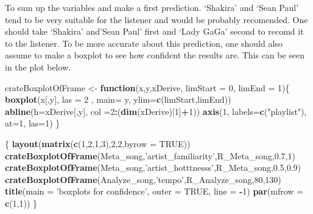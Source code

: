 \documentclass[]{article}
\newenvironment{Shaded}{\begin{snugshade}}{\end{snugshade}}
\newcommand{\KeywordTok}[1]{\textcolor[rgb]{0.13,0.29,0.53}{\textbf{#1}}}
\newcommand{\DataTypeTok}[1]{\textcolor[rgb]{0.13,0.29,0.53}{#1}}
\newcommand{\DecValTok}[1]{\textcolor[rgb]{0.00,0.00,0.81}{#1}}
\newcommand{\FloatTok}[1]{\textcolor[rgb]{0.00,0.00,0.81}{#1}}
\newcommand{\StringTok}[1]{\textcolor[rgb]{0.31,0.60,0.02}{#1}}
\newcommand{\OtherTok}[1]{\textcolor[rgb]{0.56,0.35,0.01}{#1}}
\newcommand{\ControlFlowTok}[1]{\textcolor[rgb]{0.13,0.29,0.53}{\textbf{#1}}}
\newcommand{\OperatorTok}[1]{\textcolor[rgb]{0.81,0.36,0.00}{\textbf{#1}}}
\newcommand{\NormalTok}[1]{#1}
\begin{document}
To sum up the variables and make a first prediction. `Shakira' and `Sean
Paul' tend to be very suitable for the listener and would be probably
recomended. One should take `Shakira' and'Sean Paul' first and `Lady
GaGa' second to recomd it to the listener. To be more accurate about
this prediction, one should also assume to make a boxplot to see how
confident the results are. This can be seen in the plot below.

\begin{Shaded}
\begin{Highlighting}[]
\NormalTok{crateBoxplotOfFrame <-}\StringTok{ }\ControlFlowTok{function}\NormalTok{(x,y,xDerive, }\DataTypeTok{limStart =} \DecValTok{0}\NormalTok{, }\DataTypeTok{limEnd =} \DecValTok{1}\NormalTok{)\{}
  \KeywordTok{boxplot}\NormalTok{(x[,y], }\DataTypeTok{las =} \DecValTok{2}\NormalTok{ , }\DataTypeTok{main=}\NormalTok{ y, }\DataTypeTok{ylim=}\KeywordTok{c}\NormalTok{(limStart,limEnd))}
\KeywordTok{abline}\NormalTok{(}\DataTypeTok{h=}\NormalTok{xDerive[,y], }\DataTypeTok{col =}\DecValTok{2}\OperatorTok{:}\NormalTok{(}\KeywordTok{dim}\NormalTok{(xDerive)[}\DecValTok{1}\NormalTok{]}\OperatorTok{+}\DecValTok{1}\NormalTok{))}
\KeywordTok{axis}\NormalTok{(}\DecValTok{1}\NormalTok{, }\DataTypeTok{labels=}\KeywordTok{c}\NormalTok{(}\StringTok{"playlist"}\NormalTok{), }\DataTypeTok{at=}\DecValTok{1}\NormalTok{, }\DataTypeTok{las=}\DecValTok{1}\NormalTok{)}
\NormalTok{\}}

\NormalTok{\{}
\KeywordTok{layout}\NormalTok{(}\KeywordTok{matrix}\NormalTok{(}\KeywordTok{c}\NormalTok{(}\DecValTok{1}\NormalTok{,}\DecValTok{2}\NormalTok{,}\DecValTok{1}\NormalTok{,}\DecValTok{3}\NormalTok{),}\DecValTok{2}\NormalTok{,}\DecValTok{2}\NormalTok{,}\DataTypeTok{byrow =} \OtherTok{TRUE}\NormalTok{))}
\KeywordTok{crateBoxplotOfFrame}\NormalTok{(Meta_song,}\StringTok{'artist_familiarity'}\NormalTok{,R_Meta_song,}\FloatTok{0.7}\NormalTok{,}\DecValTok{1}\NormalTok{)}
\KeywordTok{crateBoxplotOfFrame}\NormalTok{(Meta_song,}\StringTok{'artist_hotttnesss'}\NormalTok{,R_Meta_song,}\FloatTok{0.5}\NormalTok{,}\FloatTok{0.9}\NormalTok{)}
\KeywordTok{crateBoxplotOfFrame}\NormalTok{(Analyze_song,}\StringTok{'tempo'}\NormalTok{,R_Analyze_song,}\DecValTok{80}\NormalTok{,}\DecValTok{130}\NormalTok{)}
\KeywordTok{title}\NormalTok{(}\DataTypeTok{main =} \StringTok{'boxplots for confidence'}\NormalTok{, }\DataTypeTok{outer =} \OtherTok{TRUE}\NormalTok{, }\DataTypeTok{line =} \OperatorTok{-}\DecValTok{1}\NormalTok{)}
\KeywordTok{par}\NormalTok{(}\DataTypeTok{mfrow =} \KeywordTok{c}\NormalTok{(}\DecValTok{1}\NormalTok{,}\DecValTok{1}\NormalTok{))}
\NormalTok{\}}
\end{Highlighting}
\end{Shaded}
\end{document}
